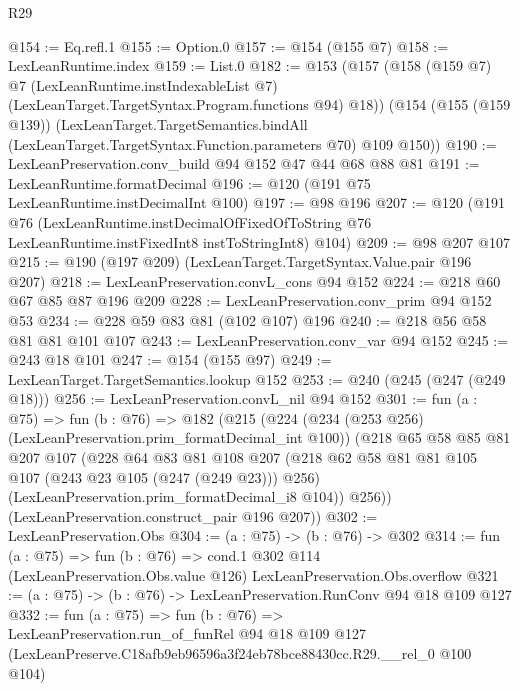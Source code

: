 \begin{lexlean}{R29}
\begin{coremodule}
@154 := Eq.refl.{1}
@155 := Option.{0}
@157 := @154 (@155 @7)
@158 := LexLeanRuntime.index
@159 := List.{0}
@182 := @153
    (@157
      (@158
        (@159 @7)
        @7
        (LexLeanRuntime.instIndexableList @7)
        (LexLeanTarget.TargetSyntax.Program.functions @94)
        @18))
    (@154
      (@155 (@159 @139))
      (LexLeanTarget.TargetSemantics.bindAll
        (LexLeanTarget.TargetSyntax.Function.parameters @70)
        @109
        @150))
@190 := LexLeanPreservation.conv_build @94 @152 @47 @44 @68 @88 @81
@191 := LexLeanRuntime.formatDecimal
@196 := @120 (@191 @75 LexLeanRuntime.instDecimalInt @100)
@197 := @98 @196
@207 := @120
    (@191
      @76
      (LexLeanRuntime.instDecimalOfFixedOfToString
        @76
        LexLeanRuntime.instFixedInt8
        instToStringInt8)
      @104)
@209 := @98 @207 @107
@215 := @190 (@197 @209) (LexLeanTarget.TargetSyntax.Value.pair @196 @207)
@218 := LexLeanPreservation.convL_cons @94 @152
@224 := @218 @60 @67 @85 @87 @196 @209
@228 := LexLeanPreservation.conv_prim @94 @152 @53
@234 := @228 @59 @83 @81 (@102 @107) @196
@240 := @218 @56 @58 @81 @81 @101 @107
@243 := LexLeanPreservation.conv_var @94 @152
@245 := @243 @18 @101
@247 := @154 (@155 @97)
@249 := LexLeanTarget.TargetSemantics.lookup @152
@253 := @240 (@245 (@247 (@249 @18)))
@256 := LexLeanPreservation.convL_nil @94 @152
@301 := fun (a : @75) =>
  fun (b : @76) =>
  @182
    (@215
      (@224
        (@234 (@253 @256) (LexLeanPreservation.prim_formatDecimal_int @100))
        (@218
          @65
          @58
          @85
          @81
          @207
          @107
          (@228
            @64
            @83
            @81
            @108
            @207
            (@218 @62 @58 @81 @81 @105 @107 (@243 @23 @105 (@247 (@249 @23))) @256)
            (LexLeanPreservation.prim_formatDecimal_i8 @104))
          @256))
      (LexLeanPreservation.construct_pair @196 @207))
@302 := LexLeanPreservation.Obs
@304 := (a : @75) -> (b : @76) -> @302
@314 := fun (a : @75) =>
  fun (b : @76) =>
  cond.{1} @302 @114 (LexLeanPreservation.Obs.value @126) LexLeanPreservation.Obs.overflow
@321 := (a : @75) -> (b : @76) -> LexLeanPreservation.RunConv @94 @18 @109 @127
@332 := fun (a : @75) =>
  fun (b : @76) =>
  LexLeanPreservation.run_of_funRel
    @94
    @18
    @109
    @127
    (LexLeanPreserve.C18afb9eb96596a3f24eb78bce88430cc.R29.__rel_0 @100 @104)
\end{coremodule}
\end{lexlean}
